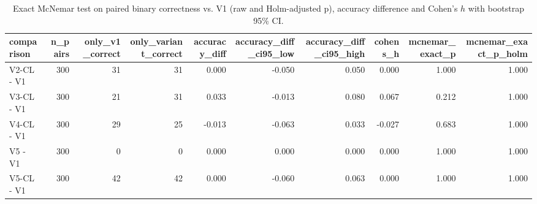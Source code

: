\begin{table}[t]
\centering
\small
\begin{tabular}{lrrrrrrrrr}
\toprule
comparison & n\_pairs & only\_v1\_correct & only\_variant\_correct & accuracy\_diff & accuracy\_diff\_ci95\_low & accuracy\_diff\_ci95\_high & cohens\_h & mcnemar\_exact\_p & mcnemar\_exact\_p\_holm \\
\midrule
V2-CL - V1 & 300 & 31 & 31 & 0.000 & -0.050 & 0.050 & 0.000 & 1.000 & 1.000 \\
V3-CL - V1 & 300 & 21 & 31 & 0.033 & -0.013 & 0.080 & 0.067 & 0.212 & 1.000 \\
V4-CL - V1 & 300 & 29 & 25 & -0.013 & -0.063 & 0.033 & -0.027 & 0.683 & 1.000 \\
V5 - V1 & 300 & 0 & 0 & 0.000 & 0.000 & 0.000 & 0.000 & 1.000 & 1.000 \\
V5-CL - V1 & 300 & 42 & 42 & 0.000 & -0.060 & 0.063 & 0.000 & 1.000 & 1.000 \\
\bottomrule
\end{tabular}
\caption{Exact McNemar test on paired binary correctness vs. V1 (raw and Holm-adjusted p), accuracy difference and Cohen's $h$ with bootstrap 95\% CI.}
\label{tab:rigor_accuracy_tests}
\end{table}
